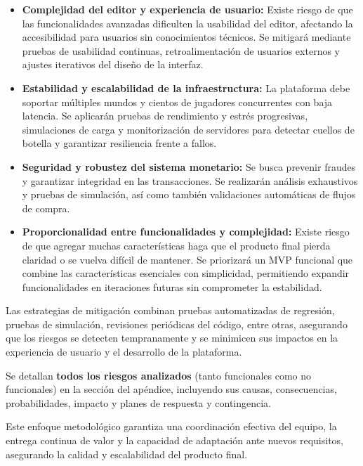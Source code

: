 \begin{itemize}
    \item \textbf{Complejidad del editor y experiencia de usuario:} Existe riesgo de que las funcionalidades avanzadas dificulten la usabilidad del editor, 
        afectando la accesibilidad para usuarios sin conocimientos técnicos. Se mitigará mediante pruebas de usabilidad continuas, 
        retroalimentación de usuarios externos y ajustes iterativos del diseño de la interfaz.
    \item \textbf{Estabilidad y escalabilidad de la infraestructura:} La plataforma debe soportar múltiples mundos y cientos de jugadores concurrentes con baja latencia.
        Se aplicarán pruebas de rendimiento y estrés progresivas, simulaciones de carga y monitorización de servidores para detectar cuellos de botella y garantizar 
        resiliencia frente a fallos.
    \item \textbf{Seguridad y robustez del sistema monetario:} Se busca prevenir fraudes y garantizar integridad 
        en las transacciones. Se realizarán análisis exhaustivos y pruebas de simulación, así como también validaciones automáticas de flujos 
        de compra.
    \item \textbf{Proporcionalidad entre funcionalidades y complejidad:} Existe riesgo de que agregar muchas características haga que el producto final pierda claridad 
        o se vuelva difícil de mantener. Se priorizará un MVP funcional que combine las características esenciales con simplicidad, permitiendo expandir 
        funcionalidades en iteraciones futuras sin comprometer la estabilidad.
\end{itemize}

Las estrategias de mitigación combinan pruebas automatizadas de regresión, pruebas de simulación, revisiones periódicas del código, entre otras,
asegurando que los riesgos se detecten tempranamente y se minimicen sus impactos en la experiencia de usuario y el desarrollo de la plataforma.
\vspace{0.5cm}

Se detallan \textbf{todos los riesgos analizados} (tanto funcionales como no funcionales) en la sección  del apéndice,
incluyendo sus causas, consecuencias, probabilidades, impacto y planes de respuesta y contingencia.
\vspace{0.25cm}

Este enfoque metodológico garantiza una coordinación efectiva del equipo, la entrega continua de valor y la capacidad de adaptación ante nuevos requisitos, 
asegurando la calidad y escalabilidad del producto final.

